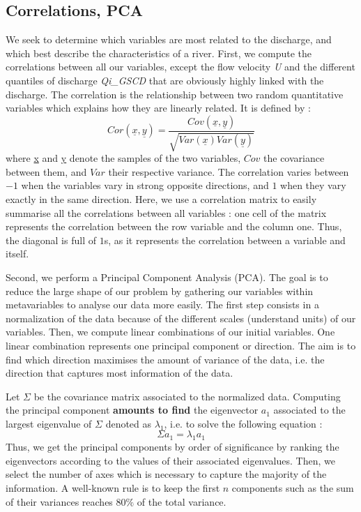 \newpage
\subsection{Correlations, PCA}

We seek to determine which variables are most related to the discharge, and which best describe the characteristics of a river. First, we compute the correlations between all our variables, except the flow velocity \textit{U} and the different quantiles of discharge \textit{Qi\_GSCD} that are obviously highly linked with the discharge. The correlation is the relationship between two random quantitative variables which explains how they are linearly related. It is defined by :
\begin{equation}
    Cor(\underline{x},\underline{y}) = \frac{Cov(\underline{x},\underline{y})}{\sqrt{Var(\underline{x})Var(\underline{y})}}
\end{equation}
where \underline{x} and \underline{y} denote the samples of the two variables, $Cov$ the covariance between them, and $Var$ their respective variance. The correlation varies between $-1$ when the variables vary in strong opposite directions, and $1$ when they vary exactly in the same direction. Here, we use a correlation matrix to easily summarise all the correlations between all variables : one cell of the matrix represents the correlation between the row variable and the column one. Thus, the diagonal is full of $1$s, as it represents the correlation between a variable and itself.\newline

Second, we perform a Principal Component Analysis (PCA). The goal is to reduce the large shape of our problem by gathering our variables within metavariables to analyse our data more easily. The first step consists in a normalization of the data because of the different scales (understand units) of our variables. Then, we compute linear combinations of our initial variables. One linear combination represents one principal component or direction. The aim is to find which direction maximises the amount of variance of the data, i.e. the direction that captures most information of the data. 

Let $\Sigma$ be the covariance matrix associated to the normalized data. Computing the principal component \textbf{amounts to find} the eigenvector $a_1$ associated to the largest eigenvalue of $\Sigma$ denoted as $\lambda_1$, i.e. to solve the following equation :
\begin{equation}
    \Sigma a_1 = \lambda_1 a_1
\end{equation}
Thus, we get the principal components by order of significance by ranking the eigenvectors according to the values of their associated eigenvalues. Then, we select the number of axes which is necessary to capture the majority of the information. A well-known rule is to keep the first $n$ components such as the sum of their variances reaches $80\%$ of the total variance.

